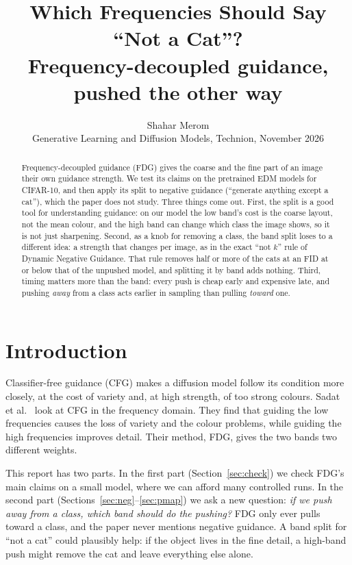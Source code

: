 \documentclass[11pt]{article}
\title{\vspace{-1.6cm}Which Frequencies Should Say ``Not a Cat''?\\[2pt]
\large Frequency-decoupled guidance, pushed the other way}
\author{Shahar Merom\\ \small Generative Learning and Diffusion Models, Technion, November 2026}
\date{}
\begin{document}
\maketitle
\vspace{-1.0cm}

\begin{abstract}
\noindent Frequency-decoupled guidance (FDG) gives the coarse and the fine part of an image their own guidance
strength. We test its claims on the pretrained EDM models for CIFAR-10, and then apply its split to negative
guidance (``generate anything except a cat''), which the paper does not study. Three things come out. First, the
split is a good tool for understanding guidance: on our model the low band's cost is the coarse layout, not the mean
colour, and the high band can change which class the image shows, so it is not just sharpening. Second, as a knob for
removing a class, the band split loses to a different idea: a strength that changes per image, as in the exact
``not $k$'' rule of Dynamic Negative Guidance. That rule removes half or more of the cats at an FID at or below that
of the unpushed model, and splitting it by band adds nothing. Third, timing matters more than the band: every push is cheap early and
expensive late, and pushing \emph{away} from a class acts earlier in sampling than pulling \emph{toward} one.
\end{abstract}

\section{Introduction}

Classifier-free guidance (CFG) makes a diffusion model follow its condition more closely, at the cost of variety
and, at high strength, of too strong colours. Sadat et al.\ \cite{fdg} look at CFG in the frequency domain. They
find that guiding the low frequencies causes the loss of variety and the colour problems, while guiding the high
frequencies improves detail. Their method, FDG, gives the two bands two different weights.

This report has two parts. In the first part (Section~\ref{sec:check}) we check FDG's main claims on a small model,
where we can afford many controlled runs. In the second part (Sections~\ref{sec:neg}--\ref{sec:pmap}) we ask a new
question: \emph{if we push away from a class, which band should do the pushing?} FDG only ever pulls toward a class,
and the paper never mentions negative guidance. A band split for ``not a cat'' could plausibly help: if the object
lives in the fine detail, a high-band push might remove the cat and leave everything else alone.
\end{document}
